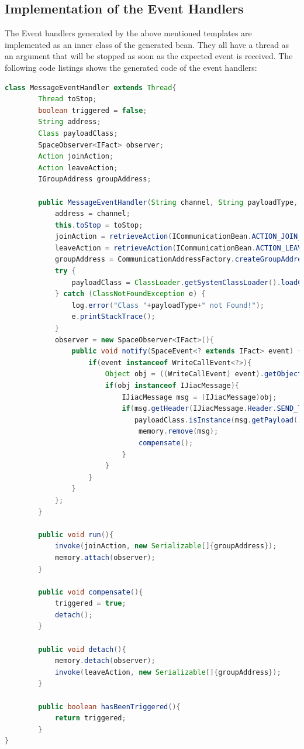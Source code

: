 \subsection{Implementation of the Event Handlers}
The Event handlers generated by the above mentioned templates are implemented as an inner class of the generated bean.
They all have a thread as an argument that will be stopped as soon as the expected event is received. The following code listings shows the generated code of the event handlers:\\

\begin{lstlisting}[language=Java , caption=MessageEventHandler implementation]
class MessageEventHandler extends Thread{
		Thread toStop;
		boolean triggered = false;
		String address;
		Class payloadClass;
		SpaceObserver<IFact> observer;
		Action joinAction;
		Action leaveAction;
		IGroupAddress groupAddress;
		
		public MessageEventHandler(String channel, String payloadType, Thread toStop){
			address = channel;
			this.toStop = toStop;
			joinAction = retrieveAction(ICommunicationBean.ACTION_JOIN_GROUP);
			leaveAction = retrieveAction(ICommunicationBean.ACTION_LEAVE_GROUP);
			groupAddress = CommunicationAddressFactory.createGroupAddress(address);
			try {
				payloadClass = ClassLoader.getSystemClassLoader().loadClass(payloadType);
			} catch (ClassNotFoundException e) {
				log.error("Class "+payloadType+" not Found!");
				e.printStackTrace();
			} 
			observer = new SpaceObserver<IFact>(){
				public void notify(SpaceEvent<? extends IFact> event) {
					if(event instanceof WriteCallEvent<?>){
						Object obj = ((WriteCallEvent) event).getObject();
						if(obj instanceof IJiacMessage){
							IJiacMessage msg = (IJiacMessage)obj;
							if(msg.getHeader(IJiacMessage.Header.SEND_TO).equals(address) &&
							   payloadClass.isInstance(msg.getPayload())){
								memory.remove(msg);
								compensate();
							}
						}
					}
				}
			};		
		}
		
		public void run(){
			invoke(joinAction, new Serializable[]{groupAddress});
			memory.attach(observer);
		}
		
		public void compensate(){
			triggered = true;
			detach();
		}
		
		public void detach(){
			memory.detach(observer);
			invoke(leaveAction, new Serializable[]{groupAddress});
		}
		
		public boolean hasBeenTriggered(){
			return triggered;
		}
}
\end{lstlisting}
                                 
